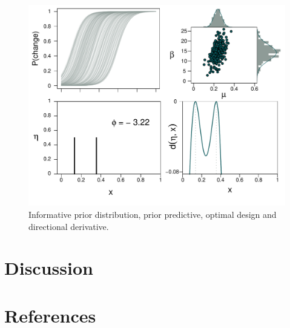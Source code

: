 \documentclass[preprint,review,12pt]{elsarticle}
\begin{document}
\begin{figure}
\includegraphics[width=\textwidth]{Joint_Normal.pdf}
\caption{Informative prior distribution, prior predictive, optimal design and directional derivative.}
\label{fig:jn}
\end{figure}

\section{Discussion}
\label{S:4}





\section*{References}



\end{document}
